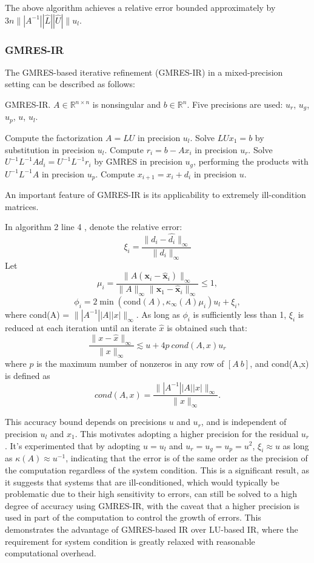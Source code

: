 The above algorithm achieves a relative error bounded approximately by $3n\||A^{-1}||\hat{L}||\hat{U}|\|u_l$.


\subsubsection{GMRES-IR}
The GMRES-based iterative refinement (GMRES-IR) in a mixed-precision setting can be described as follows:

\begin{algorithm}
    \caption{GMRES-IR. $A \in \mathbb{R}^{n \times n}$ is nonsingular and $b \in \mathbb{R}^n$. Five precisions are used: $u_r$, $u_g$, $u_p$, $u$, $u_l$.}
    \begin{algorithmic}[1]
        \State Compute the factorization $A = LU$ in precision $u_l$.
        \State Solve $LUx_1 = b$ by substitution in precision $u_l$.
            \State Compute $r_i = b - Ax_i$ in precision $u_r$.
            \State Solve $U^{-1}L^{-1}Ad_i = U^{-1}L^{-1}r_i$ by GMRES in precision $u_g$, performing the products with $U^{-1}L^{-1}A$ in precision $u_p$.
            \State Compute $x_{i+1} = x_i + d_i$ in precision $u$.
        \EndFor
    \end{algorithmic}
\end{algorithm}

An important feature of GMRES-IR is its applicability to extremely ill-condition matrices.

In algorithm 2 line 4 , denote the relative error:
\[
    \xi_i = \frac{\|d_i - \hat{d_i}\|_{\infty}}{\|d_i\|_{\infty}}
\]
Let
\[
\mu_i = \frac{\|A(\mathbf{x}_i - \hat{\mathbf{x}}_i)\|_{\infty}}{\|A\|_{\infty}\|\mathbf{x}_1 - \hat{\mathbf{x}}_i\|_{\infty}} \leq 1,
\]
\[
\phi_i = 2 \min(\text{cond}(A), \kappa_{\infty}(A)\mu_i) u_l + \xi_i,
\]
where cond(A) = $\||A^{-1}||A||x|\|_\infty$.
As long as $\phi_i$ is sufficiently less than 1, $\xi_i$ is reduced at each iteration until an iterate $\hat{x}$ is obtained such that:
\[
    \frac{\|x - \hat{x}\|_{\infty}}{\|x\|_{\infty}} \lesssim u+4p\ cond(A,x)u_r
\]
where $p$ is the maximum number of nonzeros in any row of $[A\ b]$, and cond(A,x) is defined as
\[
cond(A,x)=\frac{\||A^{-1}||A||x|\|_{\infty}}{\|x\|_{\infty}}.
\]


This accuracy bound depends on precisions $u$ and $u_r$, and is independent of precision $u_l$ and $x_1$. This motivates adopting a higher precision for the residual $u_r$. It's experimented that by adopting $u=u_l$ and $u_r=u_g=u_p=u^2$, $\xi_i\approx u$ as long as $\kappa(A)\approx u^{-1}$, indicating that the error is of the same order as the precision of the computation regardless of the system condition. This is a significant result, as it suggests that systems that are ill-conditioned, which would typically be problematic due to their high sensitivity to errors, can still be solved to a high degree of accuracy using GMRES-IR, with the caveat that a higher precision is used in part of the computation to control the growth of errors. This demonstrates the advantage of GMRES-based IR over LU-based IR, where the requirement for system condition is greatly relaxed with reasonable computational overhead\cite{Boris2021}. 

